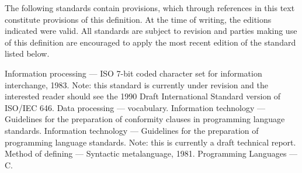 %
\begin{optDefinition}
The following standards contain provisions, which through references
in this text constitute provisions of this definition.  At the
time of writing, the editions indicated were valid.  All standards are
subject to revision and parties making use of this definition are
encouraged to apply the most recent edition of the standard listed
below.
\begin{references}
     Information processing --- ISO 7-bit coded
    character set for information interchange, 1983.  Note: this standard is
    currently under revision and the interested reader should see the 1990 Draft
    International Standard version of ISO/IEC 646.
     Data processing --- vocabulary.
     Information technology ---
    Guidelines for the preparation of conformity clauses in programming language
    standards.
     Information technology ---
    Guidelines for the preparation of programming language standards. Note: this
    is currently a draft technical report.
     Method of defining --- Syntactic metalanguage,
    1981.
     Programming Languages --- C.
\end{references}
\end{optDefinition}
